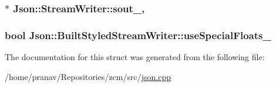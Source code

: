 \subsubsection[{\texorpdfstring{sout\+\_\+}{sout_}}]{$\ast$ Json\+::\+Stream\+Writer\+::sout\+\_\+\hspace{0.3cm}{\ttfamily [protected]}, {\ttfamily [inherited]}}\hypertarget{classJson_1_1StreamWriter_a4f5603d4228a9fa46a42cb44e5234d9b}{}\label{classJson_1_1StreamWriter_a4f5603d4228a9fa46a42cb44e5234d9b}
\subsubsection[{\texorpdfstring{use\+Special\+Floats\+\_\+}{useSpecialFloats_}}]{\setlength{\rightskip}{0pt plus 5cm}bool Json\+::\+Built\+Styled\+Stream\+Writer\+::use\+Special\+Floats\+\_\+\hspace{0.3cm}{\ttfamily [private]}}\hypertarget{structJson_1_1BuiltStyledStreamWriter_a6f1b8694b4eb17ab8c34f6d6dd8c8a4a}{}\label{structJson_1_1BuiltStyledStreamWriter_a6f1b8694b4eb17ab8c34f6d6dd8c8a4a}


The documentation for this struct was generated from the following file\+:\begin{DoxyCompactItemize}
\item 
/home/pranav/\+Repositories/zcm/src/\hyperlink{json_8cpp}{json.\+cpp}\end{DoxyCompactItemize}
